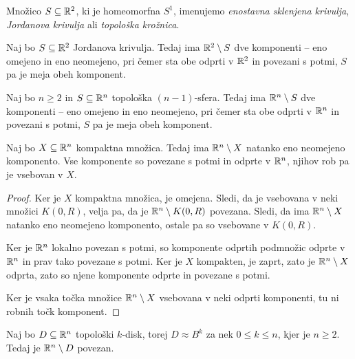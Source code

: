 \begin{definicija}
Množico $S \subseteq \mathbb{R}^2$, ki je homeomorfna $S^1$, imenujemo
\emph{enostavna sklenjena krivulja}, \emph{Jordanova krivulja} ali
\emph{topološka krožnica}.
\end{definicija}

\begin{izrek}[Jordan]
Naj bo $S \subseteq \mathbb{R}^2$ Jordanova krivulja. Tedaj ima
$\mathbb{R}^2 \setminus S$ dve komponenti -- eno omejeno in eno neomejeno,
pri čemer sta obe odprti v $\mathbb{R}^2$ in povezani s potmi, $S$ pa je
meja obeh komponent.
\end{izrek}

\begin{izrek}
Naj bo $n \geq 2$ in $S \subseteq \mathbb{R}^n$ topološka $(n-1)$-sfera.
Tedaj ima $\mathbb{R}^n \setminus S$ dve komponenti -- eno omejeno in eno
neomejeno, pri čemer sta obe odprti v $\mathbb{R}^n$ in povezani s potmi,
$S$ pa je meja obeh komponent.
\end{izrek}

\begin{lema}
Naj bo $X \subseteq \mathbb{R}^n$ kompaktna množica. Tedaj ima
$\mathbb{R}^n \setminus X$ natanko eno neomejeno komponento. Vse komponente
so povezane s potmi in odprte v $\mathbb{R}^n$, njihov rob pa je vsebovan v
$X$.
\end{lema}

\begin{proof}
Ker je $X$ kompaktna množica, je omejena. Sledi, da je vsebovana v
neki množici $K(0, R)$, velja pa, da je $\mathbb{R}^n \setminus K(0, R)$
povezana. Sledi, da ima $\mathbb{R}^n \setminus X$ natanko eno neomejeno
komponento, ostale pa so vsebovane v $K(0, R)$.

Ker je $\mathbb{R}^n$ lokalno povezan s potmi, so komponente odprtih
podmnožic odprte v $\mathbb{R}^n$ in prav tako povezane s potmi. Ker je $X$
kompakten, je zaprt, zato je $\mathbb{R}^n \setminus X$ odprta, zato so
njene komponente odprte in povezane s potmi.

Ker je vsaka točka množice $\mathbb{R}^n \setminus X$ vsebovana v neki
odprti komponenti, tu ni robnih točk komponent.
\end{proof}

\begin{izrek}\label{iz:dsk}
Naj bo $D \subseteq \mathbb{R}^n$ topološki $k$-disk, torej $D \approx B^k$
za nek $0 \leq k \leq n$, kjer je $n \geq 2$. Tedaj je
$\mathbb{R}^n \setminus D$ povezan.
\end{izrek}

